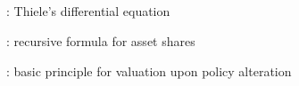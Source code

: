 \subsection*{}
\item {}: Thiele's differential equation
\item {}: recursive formula for asset shares
\item {}: basic principle for valuation upon policy
alteration
